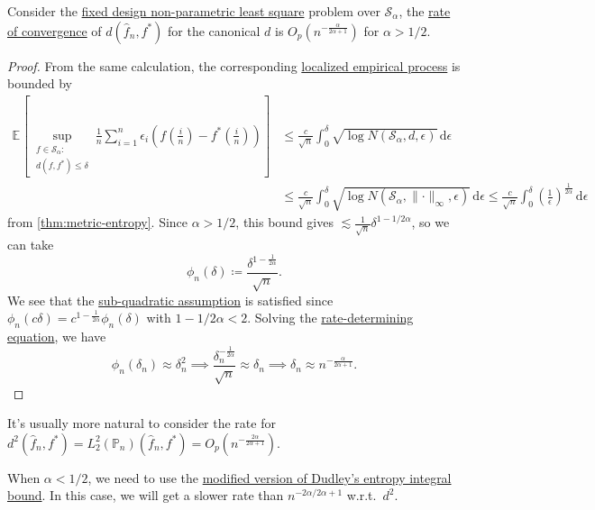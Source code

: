\begin{theorem}
	Consider the \hyperref[prb:fixed-design-non-parametric-LS]{fixed design non-parametric least square} problem over \(\mathcal{S} _\alpha \), the \hyperref[def:rate-of-convergence]{rate of convergence} of \(d(\hat{f} _n, f^{\ast} )\) for the canonical \(d\) is \(O_p(n^{- \frac{\alpha }{2\alpha + 1}})\) for \(\alpha > 1 / 2\).
\end{theorem}
\begin{proof}
	From the same calculation, the corresponding \hyperref[def:localized-EP]{localized empirical process} is bounded by
	\[
		\begin{split}
			\mathbb{E}_{}\left[\sup _{\substack{f\in \mathcal{S} _\alpha \colon \\ d(f, f^{\ast} ) \leq \delta }} \frac{1}{n} \sum_{i=1}^{n} \epsilon _i \left( f \left( \frac{i}{n} \right) - f^{\ast} \left( \frac{i}{n} \right) \right) \right]
			&\leq \frac{c}{\sqrt{n} } \int_{0}^{\delta } \sqrt{\log N(\mathcal{S} _\alpha , d, \epsilon )}  \,\mathrm{d}\epsilon \\
			&\leq \frac{c}{\sqrt{n} } \int_{0}^{\delta } \sqrt{\log N(\mathcal{S} _\alpha , \lVert \cdot \rVert _\infty , \epsilon )}  \,\mathrm{d}\epsilon
			\leq \frac{c}{\sqrt{n} } \int_{0}^{\delta } \left( \frac{1}{\epsilon } \right) ^{\frac{1}{2\alpha } } \,\mathrm{d}\epsilon
		\end{split}
	\]
	from \autoref{thm:metric-entropy}. Since \(\alpha > 1 / 2\), this bound gives \(\lesssim \frac{1}{\sqrt{n} } \delta ^{1 - 1 / 2\alpha }\), so we can take
	\[
		\phi _n(\delta ) \coloneqq \frac{\delta ^{1 - \frac{1}{2\alpha } }}{\sqrt{n} }.
	\]
	We see that the \hyperref[def:sub-quadratic-assumption]{sub-quadratic assumption} is satisfied since \(\phi _n(c \delta) = c^{1 - \frac{1}{2\alpha }} \phi _n (\delta )\) with \(1 - 1 / 2\alpha < 2\). Solving the \hyperref[def:rate-determining-equation]{rate-determining equation}, we have
	\[
		\phi _n(\delta _n) \approx \delta _n^2
		\implies \frac{\delta _n^{-\frac{1}{2\alpha }}}{\sqrt{n} } \approx \delta_n
		\implies \delta _n\approx n^{- \frac{\alpha}{2\alpha +1}} .
	\]
\end{proof}

It's usually more natural to consider the rate for \(d^2(\hat{f} _n, f^{\ast} ) = L_2^2(\mathbb{P} _n) (\hat{f} _n, f^{\ast} ) = O_p(n^{-\frac{2\alpha }{2\alpha +1}})\).

\begin{note}
	When \(\alpha < 1 / 2\), we need to use the \hyperref[col:Dudley-integral-entropy-bound-finite-resolution]{modified version of Dudley's entropy integral bound}. In this case, we will get a slower rate than \(n^{-2\alpha / 2\alpha + 1}\) w.r.t.\ \(d^2\).
\end{note}

